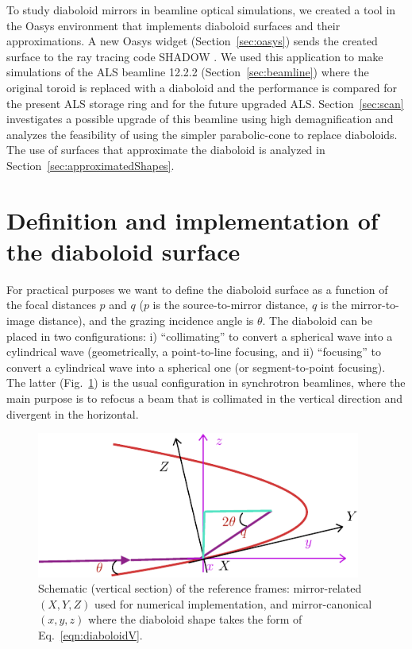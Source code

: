 \documentclass{iucr}       %
\begin{document}
To study diaboloid mirrors in beamline optical simulations, we created a tool in the Oasys environment \cite{codeOASYS} that implements diaboloid surfaces and their approximations. A new Oasys widget (Section~\ref{sec:oasys}) sends the created surface to the ray tracing code SHADOW \cite{codeSHADOW}. We used this application to make simulations of the ALS beamline 12.2.2 (Section~\ref{sec:beamline}) where the original toroid is replaced with a diaboloid and the performance is compared for the present ALS storage ring and for the future upgraded ALS. Section~\ref{sec:scan} investigates a possible upgrade of this beamline using high demagnification and analyzes the feasibility of using the simpler parabolic-cone to replace diaboloids. The use of surfaces that approximate the diaboloid is analyzed in Section~\ref{sec:approximatedShapes}.

\section{Definition and implementation of the diaboloid surface}
\label{sec:DiaboloidEqs}

For practical purposes we want to define the diaboloid surface as a function of the focal distances $p$ and $q$ ($p$ is the source-to-mirror distance, $q$ is the mirror-to-image distance), and the grazing incidence angle is $\theta$. The diaboloid can be placed in two configurations: i) ``collimating'' to convert a spherical wave into a cylindrical wave (geometrically, a point-to-line focusing, and ii) ``focusing'' to convert a cylindrical wave into a spherical one (or segment-to-point focusing). The latter (Fig.~\ref{fig:frame}) is the usual configuration in synchrotron beamlines, where the main purpose is to refocus a beam that is collimated in the vertical direction and divergent in the horizontal. 


\begin{figure}\label{fig:frame}
\includegraphics[width=0.95\textwidth]{figures/fig1.pdf}
%
\caption{Schematic (vertical section) of the reference frames: mirror-related $(X,Y,Z)$ used for numerical implementation, and mirror-canonical $(x,y,z)$ where the diaboloid shape takes the form of Eq.~\ref{eqn:diaboloidV}. }
\end{figure}
\end{document}
